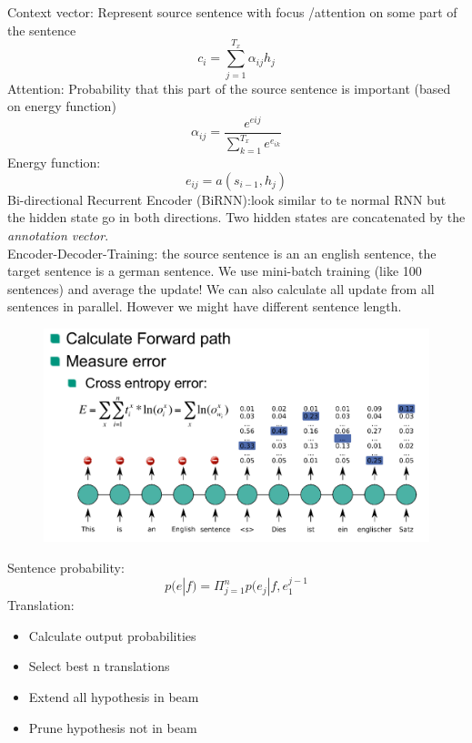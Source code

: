 Context vector: Represent source sentence with focus /attention on
some part of the sentence
\[
c_i = \sum_{j=1}^{T_x} \alpha_{ij}h_j
\]
Attention: Probability that this part of the source sentence is important (based on energy function)
\[
\alpha_{ij} = \frac{e^{eij}}{\sum_{k=1}^{T_x} e^{e_{ik}}}
\]
Energy function:
\[
e_{ij} = a(s_{i-1}, h_j)
\]
Bi-directional Recurrent Encoder (BiRNN):look similar to te normal RNN but the hidden state go in both directions. Two hidden states are concatenated by the \textit{annotation vector}.\\[1cm]
Encoder-Decoder-Training: the source sentence is an an english sentence, the target sentence is a german sentence. We use mini-batch training (like 100 sentences) and average the update! We can also calculate all update from all sentences in parallel. However we might have different sentence length.\\
\begin{figure}[h]
\includegraphics[scale=0.4]{edtraining}
\end{figure}
Sentence probability:
\[
p(e|f) = \Pi_{j=1}^n p(e_j|f, e_1^{j-1}
\]
Translation:
\begin{itemize}
	\item Calculate output probabilities
	\item Select best n translations
	\item Extend all hypothesis in beam
	\item Prune hypothesis not in beam
\end{itemize}
\newpage